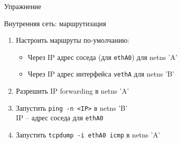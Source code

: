 \begin{frame}[fragile]{Упражнение}
    \begin{block}{Внутренняя сеть: маршрутизация}
        \begin{enumerate}
            \item Настроить маршруты по-умолчанию:
                \begin{itemize}
                    \item Через IP адрес соседа (для {\tt ethA0}) для netns 'A'
                    \item Через IP адрес интерфейса {\tt vethA} для netns 'B'
                \end{itemize}
            \item Разрешить IP forwarding в netns 'A'
            \item Запустить {\tt ping -n <IP>} в netns 'B'\\
                IP -- адрес соседа для {\tt ethA0}
            \item Запустить {\tt tcpdump -i ethA0 icmp} в netns 'A'
        \end{enumerate}
    \end{block}
\end{frame}
